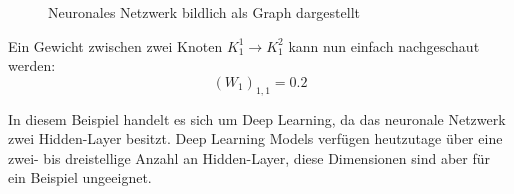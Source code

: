 \documentclass[12pt,letterpaper,ngerman]{article}
\begin{document}
\begin{example}
\begin{figure}[H]
\begin{center}
      \caption{ Neuronales Netzwerk bildlich als Graph dargestellt}
    \end{center}
  \end{figure}
  Ein Gewicht zwischen zwei Knoten $K_1^1 \to K_1^2$ kann nun einfach nachgeschaut werden:
  \[
    (W_1)_{1,1} = 0.2
  \]
\end{example}
\pagebreak
In diesem Beispiel handelt es sich um Deep Learning, da das neuronale Netzwerk 
zwei Hidden-Layer besitzt. Deep Learning Models verfügen heutzutage über
eine zwei- bis dreistellige Anzahl an Hidden-Layer, diese Dimensionen sind 
aber für ein Beispiel ungeeignet.
\end{document}
